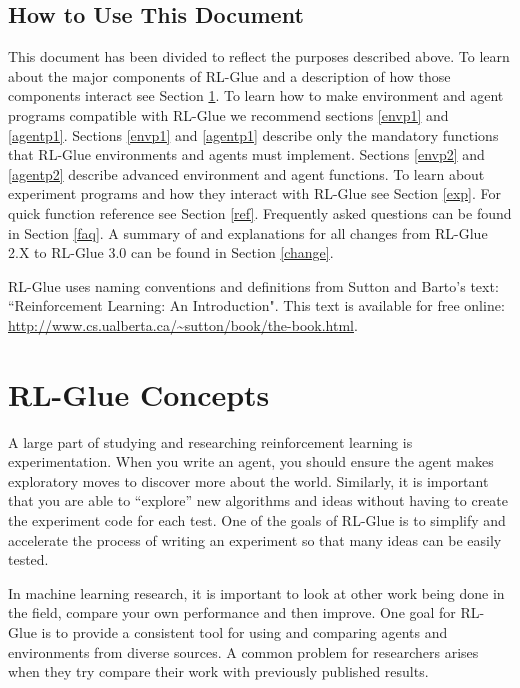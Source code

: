 \documentclass[11pt]{article}
\begin{document}
\subsection{How to Use This Document}

This document has been divided to reflect the purposes described above. To learn about the major components of RL-Glue and a description of how those components interact see Section \ref{RL-Glue}. To learn how to make environment and agent programs compatible with RL-Glue we recommend sections \ref{envp1} and \ref{agentp1}. Sections \ref{envp1} and \ref{agentp1} describe only the mandatory functions that RL-Glue environments and agents must implement. Sections \ref{envp2} and \ref{agentp2} describe advanced environment and agent functions. To learn about experiment programs and how they interact with RL-Glue see Section \ref{exp}. For quick function reference see Section \ref{ref}. Frequently asked questions can be found in Section \ref{faq}. A summary of and explanations for all changes from RL-Glue 2.X to RL-Glue 3.0 can be found in Section \ref{change}.

RL-Glue uses naming conventions and definitions from Sutton and Barto's text: ``Reinforcement Learning: An Introduction".  This text is available for free online: \url{http://www.cs.ualberta.ca/~sutton/book/the-book.html}.
 
 
\section{RL-Glue Concepts}
\label{RL-Glue}
A large part of studying and researching reinforcement learning is experimentation. When you write an agent, you should ensure the agent makes exploratory moves to discover more about the world. Similarly, it is important that you are able to ``explore'' new algorithms and ideas without having to create the experiment code for each test. One of the goals of RL-Glue is to simplify and accelerate the process of writing an experiment so that many ideas can be easily tested. 


In machine learning research, it is important to look at other work being done in the field, compare your own performance and then improve. One goal for RL-Glue is to provide a consistent tool for using and comparing agents and environments from diverse sources. A common problem for researchers arises when they try compare their work with previously published results.
\end{document}
